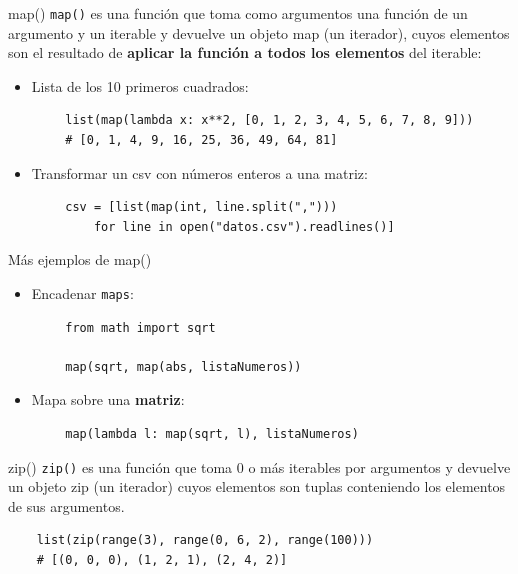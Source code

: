 \documentclass[10pt]{beamer} %
\begin{document}
\begin{frame}[fragile]{map()}
    \texttt{map()} es una función que toma como argumentos una función de un argumento y un iterable y devuelve un objeto map (un iterador), cuyos elementos son el resultado de \textbf{aplicar la función a todos los elementos} del iterable:
    \begin{itemize}
        \item Lista de los 10 primeros cuadrados:
    \end{itemize}
    \begin{verbatim}
        list(map(lambda x: x**2, [0, 1, 2, 3, 4, 5, 6, 7, 8, 9]))
        # [0, 1, 4, 9, 16, 25, 36, 49, 64, 81]
    \end{verbatim}
    \begin{itemize}
        \item Transformar un csv con números enteros a una matriz:
    \end{itemize}
    \begin{verbatim}
        csv = [list(map(int, line.split(",")))
            for line in open("datos.csv").readlines()]
    \end{verbatim}
\end{frame}

\begin{frame}[fragile]{Más ejemplos de map()}
    \begin{itemize}
        \item Encadenar \texttt{maps}:
    \end{itemize}
    \begin{verbatim}
        from math import sqrt
        
        map(sqrt, map(abs, listaNumeros))
    \end{verbatim}
    \begin{itemize}
        \item Mapa sobre una \textbf{matriz}:
    \end{itemize}
    \begin{verbatim}
        map(lambda l: map(sqrt, l), listaNumeros)
    \end{verbatim}
\end{frame}

\begin{frame}[fragile]{zip()}
\texttt{zip()} es una función que toma 0 o más iterables por argumentos y devuelve un objeto zip (un iterador) cuyos elementos son tuplas conteniendo los elementos de sus argumentos.
\begin{verbatim}
    list(zip(range(3), range(0, 6, 2), range(100)))
    # [(0, 0, 0), (1, 2, 1), (2, 4, 2)]
\end{verbatim}
\end{frame}
\end{document}
